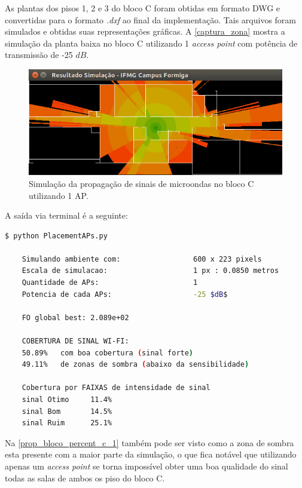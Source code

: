 \documentclass[
	12pt,				%
	twoside,			%
	a4paper,			%
	english,			%
	french,				%
	spanish,			%
	brazil				%
	]{abntex2}
\begin{document}
As plantas dos pisos 1, 2 e 3 do bloco C foram obtidas em formato DWG e
convertidas para o formato \emph{.dxf} ao final da implementação. Tais
arquivos foram simulados e obtidas suas representações gráficas. A
\autoref{captura_zona} mostra a simulação da planta baixa no bloco C
utilizando 1 \emph{access point} com potência de transmissão de -25
\(dB\).

\begin{figure}[ht]
    \caption{\label{captura_zona} Simulação da propagação de sinais de microondas no bloco C utilizando 1 AP.
        }
    \begin{center}
        \includegraphics[scale=0.7]{imagens/captura-zona-2.jpg}
    \end{center}
\end{figure}

A saída via terminal é a seguinte:

\begin{lstlisting}[language=bash]
    $ python PlacementAPs.py 
    
    Simulando ambiente com:                 600 x 223 pixels
    Escala de simulacao:                    1 px : 0.0850 metros
    Quantidade de APs:                      1
    Potencia de cada APs:                   -25 $dB$
    
    FO global best: 2.089e+02
    
    COBERTURA DE SINAL WI-FI:
    50.89%   com boa cobertura (sinal forte)
    49.11%   de zonas de sombra (abaixo da sensibilidade)
    
    Cobertura por FAIXAS de intensidade de sinal
    sinal Otimo     11.4%
    sinal Bom       14.5%
    sinal Ruim      25.1%

\end{lstlisting}

Na \autoref{prop_bloco_percent_c_1} também pode ser visto como a zona de
sombra esta presente com a maior parte da simulação, o que fica notável
que utilizando apenas um \emph{access point} se torna impossível obter
uma boa qualidade do sinal todas as salas de ambos os piso do bloco C.
\end{document}
